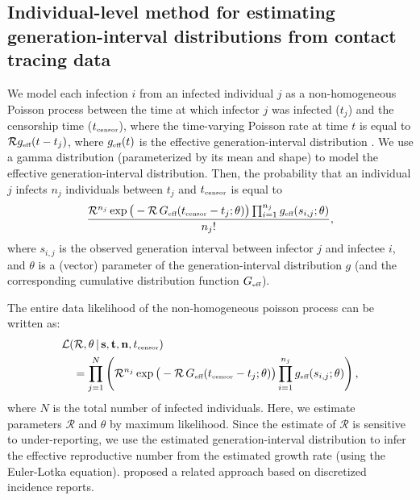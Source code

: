 \documentclass[12pt]{article}
\newcommand{\RR}{\ensuremath{{\mathcal R}}}
\newcommand{\tsub}[2]{#1_{{\textrm{\tiny #2}}}}
\begin{document}
\subsection{Individual-level method for estimating generation-interval distributions from contact tracing data}
\label{indlevel}

We model each infection $i$ from an infected individual $j$ as a non-homogeneous Poisson process between the time at which infector $j$ was infected ($t_j$) and the censorship time ($\tsub{t}{censor}$), where the time-varying Poisson rate at time $t$ is equal to $\RR \tsub{g}{eff}(t - t_j)$, where $\tsub{g}{eff}(t)$ is the effective generation-interval distribution \citep{daley2007introduction}.
We use a gamma distribution (parameterized by its mean and shape) to model the effective generation-interval distribution.
Then, the probability that an individual $j$ infects $n_j$ individuals between $t_j$ and $\tsub{t}{censor}$ is equal to
\begin{equation}
\frac{\RR^{n_j} \exp \big(- \RR\, \tsub{G}{eff}(\tsub{t}{censor} - t_j ;\theta) \big) \prod_{i=1}^{n_j} \tsub{g}{eff}(s_{i, j}; \theta)}{n_j!},
\end{equation}
where $s_{i,j}$ is the observed generation interval between infector $j$ and infectee $i$, and $\theta$ is a (vector) parameter of the generation-interval distribution $g$ (and the corresponding cumulative distribution function $\tsub{G}{eff}$).

The entire data likelihood of the non-homogeneous poisson process can be written as:
\begin{equation}\label{eq:nonhomogeneous}
\begin{aligned}
&\mathcal{L}(\RR, \theta\,|\, \mathbf{s}, \mathbf{t}, \mathbf{n}, \tsub{t}{censor})\\
&\quad=\prod_{j=1}^N \left(\RR^{n_j} \exp \big(- \RR \, \tsub{G}{eff}(\tsub{t}{censor} - t_j ;\theta) \big) \prod_{i=1}^{n_j} \tsub{g}{eff}(s_{i, j}; \theta) \right),
\end{aligned}
\end{equation}
where $N$ is the total number of infected individuals.
Here, we estimate parameters $\RR$ and $\theta$ by maximum likelihood.
Since the estimate of $\RR$ is sensitive to under-reporting, we use the estimated generation-interval distribution to infer the effective reproductive number from the estimated growth rate (using the Euler-Lotka equation).
\cite{forsberg2008likelihood} proposed a related approach based on discretized incidence reports.
\end{document}
